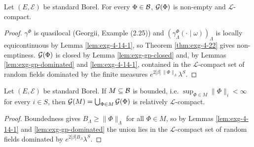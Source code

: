 \begin{theorem}[Georgii (4.23)(a)]
    \label{thm:exg-4-23-a}
    \leanok

    Let $(E,\mathcal E)$ be standard Borel. For every $\Phi\in\mathcal{B}$, $\mathcal{G}(\Phi)$ is
    non-empty and $\mathcal L$-compact.
\end{theorem}
\begin{proof}
    \leanok

    $\gamma^\Phi$ is quasilocal (Georgii, Example (2.25)) and
    $(\gamma^\Phi_\Lambda(\cdot\mid\omega))_\Lambda$ is locally equicontinuous by
    Lemma \ref{lem:exg-4-14-1}, so Theorem \ref{thm:exg-4-22} gives non-emptiness.
    $\mathcal{G}(\Phi)$ is closed by Lemma \ref{lem:exg-gp-closed} and, by
    Lemmas \ref{lem:exg-gp-dominated} and \ref{lem:exg-4-14-1}, contained in the
    $\mathcal L$-compact set of random fields dominated by the finite measures
    $e^{2|\beta|\,\|\Phi\|_\Lambda}\lambda^S$.
\end{proof}

\begin{theorem}[Georgii (4.23)(b)]
    \label{thm:exg-4-23-b}
    \leanok

    Let $(E,\mathcal E)$ be standard Borel. If $M\subseteq\mathcal{B}$ is bounded, i.e.
    $\sup_{\Phi\in M}\|\Phi\|_i<\infty$ for every $i\in S$, then
    $\mathcal{G}(M)=\bigcup_{\Phi\in M}\mathcal{G}(\Phi)$ is relatively $\mathcal L$-compact.
\end{theorem}
\begin{proof}
    \leanok

    Boundedness gives $B_\Lambda\ge\|\Phi\|_\Lambda$ for all $\Phi\in M$, so by
    Lemmas \ref{lem:exg-4-14-1} and \ref{lem:exg-gp-dominated} the union lies in the
    $\mathcal L$-compact set of random fields dominated by $e^{2|\beta|B_\Lambda}\lambda^S$.
\end{proof}

